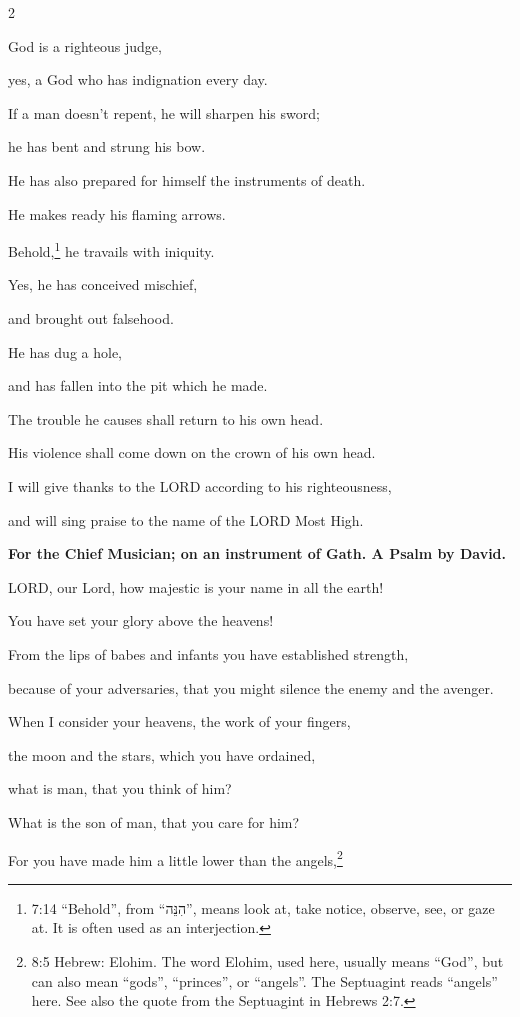 \begin{multicols}{2}
	
	\myverse{}God is a righteous judge,
	
	yes, a God who has indignation every day.
	
	
	\myverse{}If a man doesn’t repent, he will sharpen his sword;
	
	he has bent and strung his bow.
	
	
	\myverse{}He has also prepared for himself the instruments of death.
	
	He makes ready his flaming arrows.
	
	
	\myverse{}Behold,\footnote{7:14 “Behold”, from “הִנֵּה”, means look at, take notice, observe, see, or gaze at. It is often used as an interjection.} he travails with iniquity.
	
	Yes, he has conceived mischief,
	
	and brought out falsehood.
	
	
	\myverse{}He has dug a hole,
	
	and has fallen into the pit which he made.
	
	
	\myverse{}The trouble he causes shall return to his own head.
	
	His violence shall come down on the crown of his own head.
	
	
	\myverse{}I will give thanks to the LORD according to his righteousness,
	
	and will sing praise to the name of the LORD Most High.
	
	
	\mychapter{}\textbf{For the Chief Musician; on an instrument of Gath. A Psalm by David.}
	
	\myverse*{}LORD, our Lord, how majestic is your name in all the earth!
	
	You have set your glory above the heavens!
	
	
	\myverse{}From the lips of babes and infants you have established strength,
	
	because of your adversaries, that you might silence the enemy and the avenger.
	
	
	\myverse{}When I consider your heavens, the work of your fingers,
	
	the moon and the stars, which you have ordained,
	
	
	\myverse{}what is man, that you think of him?
	
	What is the son of man, that you care for him?
	
	
	\myverse{}For you have made him a little lower than the angels,\footnote{8:5 Hebrew: Elohim. The word Elohim, used here, usually means “God”, but can also mean “gods”, “princes”,	or “angels”. The Septuagint reads “angels” here. See also the quote from the Septuagint in Hebrews 2:7.}
	

\end{multicols}
